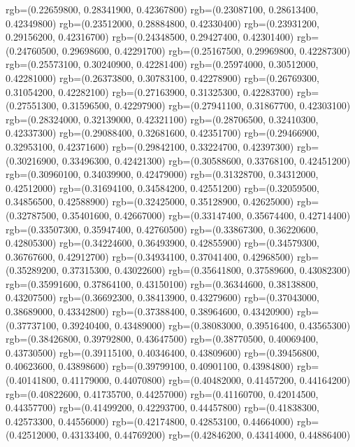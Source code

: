 {{      rgb=(0.22659800, 0.28341900, 0.42367800)
      rgb=(0.23087100, 0.28613400, 0.42349800)
      rgb=(0.23512000, 0.28884800, 0.42330400)
      rgb=(0.23931200, 0.29156200, 0.42316700)
      rgb=(0.24348500, 0.29427400, 0.42301400)
      rgb=(0.24760500, 0.29698600, 0.42291700)
      rgb=(0.25167500, 0.29969800, 0.42287300)
      rgb=(0.25573100, 0.30240900, 0.42281400)
      rgb=(0.25974000, 0.30512000, 0.42281000)
      rgb=(0.26373800, 0.30783100, 0.42278900)
      rgb=(0.26769300, 0.31054200, 0.42282100)
      rgb=(0.27163900, 0.31325300, 0.42283700)
      rgb=(0.27551300, 0.31596500, 0.42297900)
      rgb=(0.27941100, 0.31867700, 0.42303100)
      rgb=(0.28324000, 0.32139000, 0.42321100)
      rgb=(0.28706500, 0.32410300, 0.42337300)
      rgb=(0.29088400, 0.32681600, 0.42351700)
      rgb=(0.29466900, 0.32953100, 0.42371600)
      rgb=(0.29842100, 0.33224700, 0.42397300)
      rgb=(0.30216900, 0.33496300, 0.42421300)
      rgb=(0.30588600, 0.33768100, 0.42451200)
      rgb=(0.30960100, 0.34039900, 0.42479000)
      rgb=(0.31328700, 0.34312000, 0.42512000)
      rgb=(0.31694100, 0.34584200, 0.42551200)
      rgb=(0.32059500, 0.34856500, 0.42588900)
      rgb=(0.32425000, 0.35128900, 0.42625000)
      rgb=(0.32787500, 0.35401600, 0.42667000)
      rgb=(0.33147400, 0.35674400, 0.42714400)
      rgb=(0.33507300, 0.35947400, 0.42760500)
      rgb=(0.33867300, 0.36220600, 0.42805300)
      rgb=(0.34224600, 0.36493900, 0.42855900)
      rgb=(0.34579300, 0.36767600, 0.42912700)
      rgb=(0.34934100, 0.37041400, 0.42968500)
      rgb=(0.35289200, 0.37315300, 0.43022600)
      rgb=(0.35641800, 0.37589600, 0.43082300)
      rgb=(0.35991600, 0.37864100, 0.43150100)
      rgb=(0.36344600, 0.38138800, 0.43207500)
      rgb=(0.36692300, 0.38413900, 0.43279600)
      rgb=(0.37043000, 0.38689000, 0.43342800)
      rgb=(0.37388400, 0.38964600, 0.43420900)
      rgb=(0.37737100, 0.39240400, 0.43489000)
      rgb=(0.38083000, 0.39516400, 0.43565300)
      rgb=(0.38426800, 0.39792800, 0.43647500)
      rgb=(0.38770500, 0.40069400, 0.43730500)
      rgb=(0.39115100, 0.40346400, 0.43809600)
      rgb=(0.39456800, 0.40623600, 0.43898600)
      rgb=(0.39799100, 0.40901100, 0.43984800)
      rgb=(0.40141800, 0.41179000, 0.44070800)
      rgb=(0.40482000, 0.41457200, 0.44164200)
      rgb=(0.40822600, 0.41735700, 0.44257000)
      rgb=(0.41160700, 0.42014500, 0.44357700)
      rgb=(0.41499200, 0.42293700, 0.44457800)
      rgb=(0.41838300, 0.42573300, 0.44556000)
      rgb=(0.42174800, 0.42853100, 0.44664000)
      rgb=(0.42512000, 0.43133400, 0.44769200)
      rgb=(0.42846200, 0.43414000, 0.44886400)
}}

